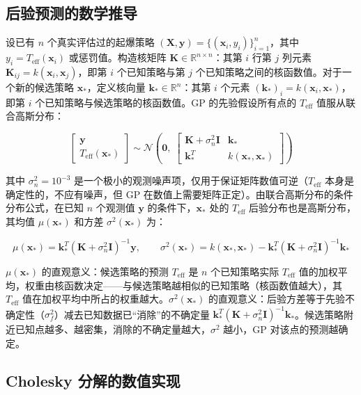 \documentclass[12pt,a4paper]{ctexart}
\newcommand{\Teff}{T_{\text{eff}}}
\newcommand{\R}{\mathbb{R}}
\newcommand{\N}{\mathcal{N}}
\newcommand{\X}{\mathbf{X}}
\newcommand{\y}{\mathbf{y}}
\newcommand{\K}{\mathbf{K}}
\newcommand{\kstar}{\mathbf{k}_*}
\begin{document}
\subsection{后验预测的数学推导}

设已有 $n$ 个真实评估过的起爆策略 $(\X, \y) = \{(\mathbf{x}_i, y_i)\}_{i=1}^n$，其中 $y_i = \Teff(\mathbf{x}_i)$ 或惩罚值。构造核矩阵 $\K \in \R^{n \times n}$：其第 $i$ 行第 $j$ 列元素 $\K_{ij} = k(\mathbf{x}_i, \mathbf{x}_j)$，即第 $i$ 个已知策略与第 $j$ 个已知策略之间的核函数值。对于一个新的候选策略 $\mathbf{x}_*$，定义核向量 $\kstar \in \R^{n}$：其第 $i$ 个元素 $(\kstar)_i = k(\mathbf{x}_i, \mathbf{x}_*)$，即第 $i$ 个已知策略与候选策略的核函数值。GP 的先验假设所有点的 $\Teff$ 值服从联合高斯分布：

\begin{equation}
\begin{bmatrix} \y \\ \Teff(\mathbf{x}_*) \end{bmatrix} \sim \N\!\left(
\mathbf{0},\;
\begin{bmatrix} \K + \sigma_n^2 \mathbf{I} & \kstar \\[2pt] \kstar^T & k(\mathbf{x}_*, \mathbf{x}_*) \end{bmatrix}
\right)
\end{equation}

其中 $\sigma_n^2 = 10^{-3}$ 是一个极小的观测噪声项，仅用于保证矩阵数值可逆（$\Teff$ 本身是确定性的，不应有噪声，但 GP 在数值上需要矩阵正定）。由联合高斯分布的条件分布公式，在已知 $n$ 个观测值 $\y$ 的条件下，$\mathbf{x}_*$ 处的 $\Teff$ 后验分布也是高斯分布，其均值 $\mu(\mathbf{x}_*)$ 和方差 $\sigma^2(\mathbf{x}_*)$ 为：

\begin{equation}
\boxed{\mu(\mathbf{x}_*) = \kstar^T (\K + \sigma_n^2 \mathbf{I})^{-1} \y}, \qquad
\boxed{\sigma^2(\mathbf{x}_*) = k(\mathbf{x}_*, \mathbf{x}_*) - \kstar^T (\K + \sigma_n^2 \mathbf{I})^{-1} \kstar}
\end{equation}

$\mu(\mathbf{x}_*)$ 的直观意义：候选策略的预测 $\Teff$ 是 $n$ 个已知策略实际 $\Teff$ 值的加权平均，权重由核函数决定——与候选策略越相似的已知策略（核函数值越大），其 $\Teff$ 值在加权平均中所占的权重越大。$\sigma^2(\mathbf{x}_*)$ 的直观意义：后验方差等于先验不确定性（$\sigma_f^2$）减去已知数据已``消除''的不确定量 $\kstar^T (\K + \sigma_n^2\mathbf{I})^{-1}\kstar$。候选策略附近已知点越多、越密集，消除的不确定量越大，$\sigma^2$ 越小，GP 对该点的预测越确定。

\subsection{Cholesky 分解的数值实现}
\end{document}
